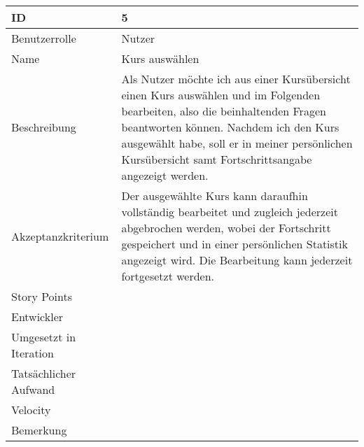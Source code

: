 \begin{tabularx}{\textwidth}{|p{}|X|}
	\hline
	ID & 5\\
	\hline
	Benutzerrolle & Nutzer\\
	\hline
	Name & Kurs auswählen\\
	\hline
	Beschreibung & Als Nutzer möchte ich aus einer Kursübersicht einen Kurs auswählen und im Folgenden bearbeiten, also die beinhaltenden Fragen beantworten können. Nachdem ich den Kurs ausgewählt habe, soll er in meiner persönlichen Kursübersicht samt Fortschrittsangabe angezeigt werden.\\
	\hline
	Akzeptanzkriterium & Der ausgewählte Kurs kann daraufhin vollständig bearbeitet und zugleich jederzeit abgebrochen werden, wobei der Fortschritt gespeichert und in einer persönlichen Statistik angezeigt wird. Die Bearbeitung kann jederzeit fortgesetzt werden.\\
	\hline
	Story Points & \\
	\hline
	Entwickler & \\
	\hline
	Umgesetzt in Iteration & \\
	\hline
	Tatsächlicher Aufwand & \\
	\hline
	Velocity & \\
	\hline
	Bemerkung & \\
	\hline
\end{tabularx}
\vspace{20pt}

